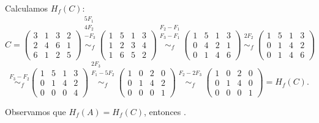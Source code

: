 \documentclass[a4paper,12pt]{article}
\begin{document}
\begin{ejercicio}[title=Ejercicio 11]
Calculamos $H_f(C)$:
\[
C =
\begin{pmatrix}
3 & 1 & 3 & 2\\
2 & 4 & 6 & 1\\
6 & 1 & 2 & 5
\end{pmatrix}
\overset{\substack{5F_1 \\ 4F_2 \\ -F_3 \\ {}}}{\sim_f}
\begin{pmatrix}
1 & 5 & 1 & 3\\
1 & 2 & 3 & 4\\
1 & 6 & 5 & 2
\end{pmatrix}
\overset{\substack{F_2-F_1 \\ F_3-F_1 \\ {}}}{\sim_f}
\begin{pmatrix}
1 & 5 & 1 & 3\\
0 & 4 & 2 & 1\\
0 & 1 & 4 & 6
\end{pmatrix}
\overset{\substack{2F_2 \\ {}}}{\sim_f}
\begin{pmatrix}
1 & 5 & 1 & 3\\
0 & 1 & 4 & 2\\
0 & 1 & 4 & 6
\end{pmatrix}
\]
\[
\overset{F_3-F_2}{\sim_f}
\begin{pmatrix}
1 & 5 & 1 & 3\\
0 & 1 & 4 & 2\\
0 & 0 & 0 & 4
\end{pmatrix}
\overset{\substack{2F_3 \\ F_1 - 5F_2 \\ {}}}{\sim_f}
\begin{pmatrix}
1 & 0 & 2 & 0\\
0 & 1 & 4 & 2\\
0 & 0 & 0 & 1
\end{pmatrix}
\overset{\substack{F_2 - 2F_3 \\ {}}}{\sim_f}
\begin{pmatrix}
1 & 0 & 2 & 0\\
0 & 1 & 4 & 0\\
0 & 0 & 0 & 1
\end{pmatrix}
= H_f(C).
\]

\vspace{0.5em}

Observamos que $H_f(A) = H_f(C)$, entonces .

\end{ejercicio}
\end{document}
